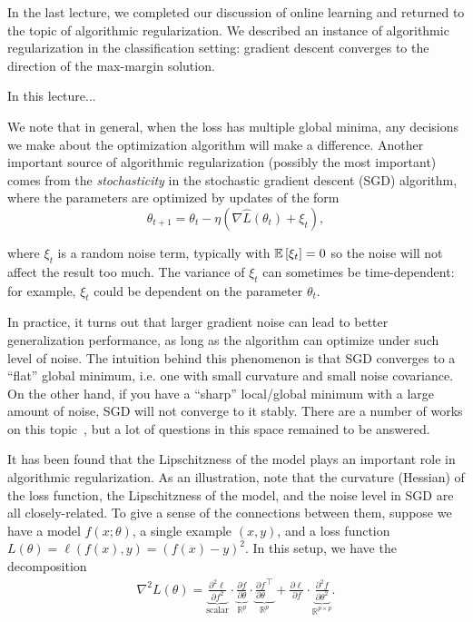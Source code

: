\setcounter{section}{0}




In the last lecture, we completed our discussion of online learning and returned to the topic of algorithmic regularization. We described an instance of algorithmic regularization in the classification setting: gradient descent converges to the direction of the max-margin solution.

In this lecture...

We note that in general, when the loss has multiple global minima, any decisions we make about the optimization algorithm will make a difference. Another important source of algorithmic regularization (possibly the most important) comes from the \textit{stochasticity} in the stochastic gradient descent (SGD) algorithm, where the parameters are optimized by updates of the form
\begin{equation}
\theta_{t+1} = \theta_t - \eta(\nabla\hat{L}(\theta_t) + \xi_t),
\end{equation}

where $\xi_t$ is a random noise term, typically with $\mathbb{E}\left[\xi_t\right]=0$ so the noise will not affect the result too much. The variance of $\xi_t$ can sometimes be time-dependent: for example, $\xi_t$ could be dependent on the parameter $\theta_t$. 

In practice, it turns out that larger gradient noise can lead to better generalization performance, as long as the algorithm can optimize under such level of noise. The intuition behind this phenomenon is that SGD converges to a ``flat'' global minimum, i.e. one with small curvature and small noise covariance. On the other hand, if you have a ``sharp'' local/global minimum with a large amount of noise, SGD will not converge to it stably. There are a number of works on this topic~\cite{haochen2020shape,blanc2020implicit}, but a lot of questions in this space remained to be answered.

It has been found that the Lipschitzness of the model plays an important role in algorithmic regularization. As an illustration, note that the curvature (Hessian) of the loss function, the Lipschitzness of the model, and the noise level in SGD are all closely-related. To give a sense of the connections between them, suppose we have a model $f(x; \theta)$, a single example $(x, y)$, and a loss function $L(\theta) = \ell (f(x), y) = (f(x) - y)^2$. In this setup, we have the decomposition
\begin{align}
\nabla^2 L(\theta) = \underbrace{{\frac{\partial^2 \ell}{\partial f^2}}}_{\text{scalar}} \cdot \underbrace{\frac{\partial f}{\partial \theta}}_{\mathbb{R}^p} \cdot \underbrace{\frac{\partial f}{\partial \theta}^\top}_{\mathbb{R}^p} + \frac{\partial \ell}{\partial f} \cdot  \underbrace{\frac{\partial^2 f}{\partial \theta^2}}_{\mathbb{R}^{p\times p}}.
\end{align}

